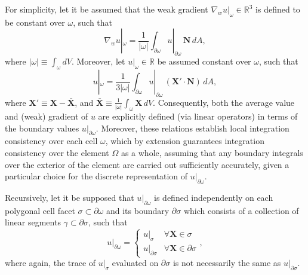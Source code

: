 \documentclass[10pt,a4paper]{article}
\begin{document}
For simplicity, let it be assumed that the weak gradient $\nabla_{w} u |_{\omega} \in \mathbb{R}^3$ is defined to be constant over $\omega$, such that
\begin{equation}
  \nabla_{w} u |_{\omega} = \frac{1}{|\omega|} \int_{\partial \omega} u |_{\partial \omega} \, \mathbf{N} \, dA,
\end{equation}
where $|\omega| \equiv \int_{\omega} dV$. Moreover, let $u |_{\omega} \in \mathbb{R}$ be assumed constant over $\omega$, such that
\begin{equation}
	u |_{\omega} = \frac{1}{3 | \omega |} \int_{\partial \omega} u |_{\partial \omega} \, (\mathbf{X}' \cdot \mathbf{N}) \, dA,
\end{equation}
where $\mathbf{X}' \equiv \mathbf{X} - \bar{\mathbf{X}}$, and $\bar{\mathbf{X}} \equiv \frac{1}{|\omega|} \int_{\omega} \mathbf{X} \, dV$. Consequently, both the average value and (weak) gradient of $u$ are explicitly defined (via linear operators) in terms of the boundary values $u |_{\partial \omega}$. Moreover, these relations establish local integration consistency over each cell $\omega$, which by extension guarantees integration consistency over the element $\Omega$ as a whole, assuming that any boundary integrals over the exterior of the element are carried out sufficiently accurately, given a particular choice for the discrete representation of $u |_{\partial \omega}$.

Recursively, let it be supposed that $u |_{\partial \omega}$ is defined independently on each polygonal cell facet $\sigma \subset \partial \omega$ and its boundary $\partial \sigma$ which consists of a collection of linear segments $\gamma \subset \partial \sigma$, such that
\begin{equation}
  u |_{\partial \omega} = \left\{ \begin{array}{cc} u |_{\sigma} & \forall \mathbf{X} \in \sigma \\ u |_{\partial \sigma} & \forall \mathbf{X} \in \partial \sigma \end{array} \right. ,
\end{equation}
where again, the trace of $u |_{\sigma}$ evaluated on $\partial \sigma$ is not necessarily the same as $u |_{\partial \sigma}$.
\end{document}
